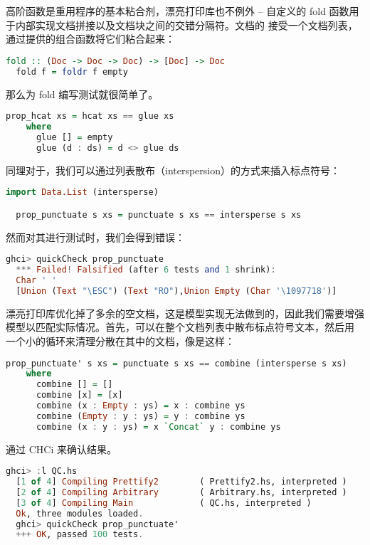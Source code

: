 \documentclass[./main.tex]{subfiles}
\begin{document}
高阶函数是重用程序的基本粘合剂，漂亮打印库也不例外 -- 自定义的 fold 函数用于内部实现文档拼接以及文档块之间的交错分隔符。文档的
接受一个文档列表，通过提供的组合函数将它们粘合起来：

\begin{lstlisting}[language=Haskell]
  fold :: (Doc -> Doc -> Doc) -> [Doc] -> Doc
  fold f = foldr f empty
\end{lstlisting}

那么为 fold 编写测试就很简单了。

\begin{lstlisting}[language=Haskell]
  prop_hcat xs = hcat xs == glue xs
    where
      glue [] = empty
      glue (d : ds) = d <> glue ds
\end{lstlisting}

同理对于，我们可以通过列表散布（interspersion）的方式来插入标点符号：

\begin{lstlisting}[language=Haskell]
  import Data.List (intersperse)

  prop_punctuate s xs = punctuate s xs == intersperse s xs
\end{lstlisting}

然而对其进行测试时，我们会得到错误：

\begin{lstlisting}[language=Haskell]
  ghci> quickCheck prop_punctuate
  *** Failed! Falsified (after 6 tests and 1 shrink):
  Char ' '
  [Union (Text "\ESC") (Text "RO"),Union Empty (Char '\1097718')]
\end{lstlisting}

漂亮打印库优化掉了多余的空文档，这是模型实现无法做到的，因此我们需要增强模型以匹配实际情况。首先，可以在整个文档列表中散布标点符号文本，然后用
一个小的循环来清理分散在其中的文档，像是这样：

\begin{lstlisting}[language=Haskell]
  prop_punctuate' s xs = punctuate s xs == combine (intersperse s xs)
    where
      combine [] = []
      combine [x] = [x]
      combine (x : Empty : ys) = x : combine ys
      combine (Empty : y : ys) = y : combine ys
      combine (x : y : ys) = x `Concat` y : combine ys
\end{lstlisting}

通过 CHCi 来确认结果。

\begin{lstlisting}[language=Haskell]
  ghci> :l QC.hs
  [1 of 4] Compiling Prettify2        ( Prettify2.hs, interpreted )
  [2 of 4] Compiling Arbitrary        ( Arbitrary.hs, interpreted )
  [3 of 4] Compiling Main             ( QC.hs, interpreted )
  Ok, three modules loaded.
  ghci> quickCheck prop_punctuate'
  +++ OK, passed 100 tests.
\end{lstlisting}
\end{document}
